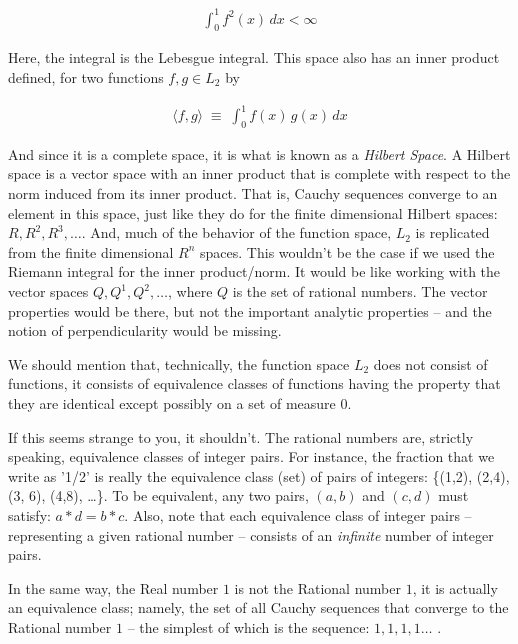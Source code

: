 \documentclass{article}
\begin{document}
\begin{eqnarray}
\int_0^1 f^2(x) \, dx < \infty
\end{eqnarray}

Here, the integral is the Lebesgue integral. This space also has an inner 
product defined, for two functions $f, g \in L_2$ by

\begin{eqnarray}
\langle f, g \rangle \; \equiv \; \int_0^1 f(x)\, g(x)\, dx
\end{eqnarray}

And since it is a complete space, it is what is known as a {\em Hilbert Space\/}.
A Hilbert space is a vector space with an inner product that is complete with 
respect to the norm induced from its inner product. 
That is, Cauchy sequences converge to an element in this
space, just like they do for the finite dimensional Hilbert spaces: $R, R^2, R^3, \ldots$.
And, much of the behavior of the function space, $L_2$ is replicated from 
the finite dimensional $R^n$ spaces. This wouldn't be the case if we used
the Riemann integral for the inner product/norm. It would be like
working with the vector spaces $Q, Q^1, Q^2, \ldots$, where $Q$ is the set 
of rational numbers. The vector properties would be there, but not 
the important analytic properties -- and the notion of perpendicularity would
be missing.

We should mention that, technically, the function space $L_2$ does not 
consist of functions, it consists of 
equivalence classes of functions having the property
that they are identical except possibly on a set of measure $0$.

If this seems strange to you, it shouldn't. The rational numbers are, strictly 
speaking, equivalence classes of integer pairs.
For instance, the fraction that we write as '1/2' is really the 
equivalence class (set) of pairs of integers: 
\{(1,2), (2,4), (3, 6), (4,8), \ldots \}.
To be equivalent, any two pairs, $(a, b)$ and $(c, d)$ must satisfy: 
$a * d = b * c$. Also, note that each equivalence class of integer pairs --
representing a given rational number -- consists of an {\em infinite\/} number 
of integer pairs.

In the same way, the Real number $1$ is not the Rational number $1$, it is 
actually an equivalence class; namely, the set of all Cauchy sequences that 
converge to the Rational number $1$ -- the simplest of which is the 
sequence: $1, 1, 1, 1\ldots$ .
\end{document}
